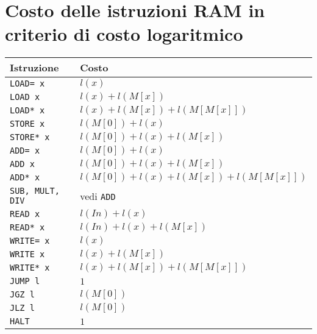 \documentclass[a4paper,11pt,twoside]{article}
\theoremstyle{plain}
\theoremstyle{definition}
\theoremstyle{remark}
\begin{document}
\section{Costo delle istruzioni RAM in criterio di costo logaritmico}
\begin{table}[htb]
  \centering
  \begin{tabular}{ll}
    \toprule
    Istruzione & Costo \\
    \midrule
    \texttt{LOAD= x}  & $l(x)$ \\
    \texttt{LOAD x}   & $l(x) + l(M[x])$ \\
    \texttt{LOAD* x}  & $l(x) + l(M[x]) + l(M[M[x]])$ \\
    \texttt{STORE x}  & $l(M[0]) + l(x)$ \\
    \texttt{STORE* x} & $l(M[0]) + l(x) + l(M[x])$ \\
    \texttt{ADD= x}   & $l(M[0]) + l(x)$ \\
    \texttt{ADD x}    & $l(M[0]) + l(x) + l(M[x])$ \\
    \texttt{ADD* x}   & $l(M[0]) + l(x) + l(M[x]) + l(M[M[x]])$ \\
    \texttt{SUB, MULT, DIV} & vedi \texttt{ADD} \\
    \texttt{READ x}   & $l(In) + l(x)$ \\
    \texttt{READ* x}  & $l(In) + l(x) + l(M[x])$ \\
    \texttt{WRITE= x} & $l(x)$ \\
    \texttt{WRITE x}  & $l(x) + l(M[x])$ \\
    \texttt{WRITE* x} & $l(x) + l(M[x]) + l(M[M[x]])$ \\
    \texttt{JUMP l}   & $1$ \\
    \texttt{JGZ l}    & $l(M[0])$ \\
    \texttt{JLZ l}    & $l(M[0])$ \\
    \texttt{HALT}     & $1$ \\
    \bottomrule
  \end{tabular}
\end{table}
\end{document}
